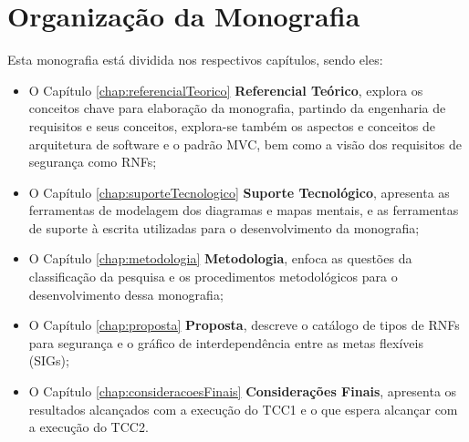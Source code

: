 \section{Organização da Monografia}

Esta monografia está dividida nos respectivos capítulos, sendo eles: 
\begin{itemize}
	\item O Capítulo \ref{chap:referencialTeorico} \textbf{Referencial Teórico}, explora os conceitos chave para elaboração da monografia, partindo da engenharia de requisitos e seus conceitos, explora-se também os aspectos e conceitos de arquitetura de software e o padrão MVC, bem como a visão dos requisitos de segurança como RNFs;
	
	\item  O Capítulo \ref{chap:suporteTecnologico} \textbf{Suporte Tecnológico}, apresenta as ferramentas de modelagem dos diagramas e mapas mentais, e as ferramentas de suporte à escrita utilizadas para o desenvolvimento da monografia;
	
	\item O Capítulo \ref{chap:metodologia} \textbf{Metodologia}, enfoca as questões da classificação da pesquisa e os procedimentos metodológicos para o desenvolvimento dessa monografia;
	
	\item O Capítulo \ref{chap:proposta} \textbf{Proposta}, descreve o catálogo de tipos de RNFs para segurança e o gráfico de interdependência entre as metas flexíveis (SIGs);
	
	\item  O Capítulo \ref{chap:consideracoesFinais} \textbf{Considerações Finais}, apresenta os resultados alcançados com a execução do TCC1 e o que espera alcançar com a execução do TCC2.
\end{itemize}


